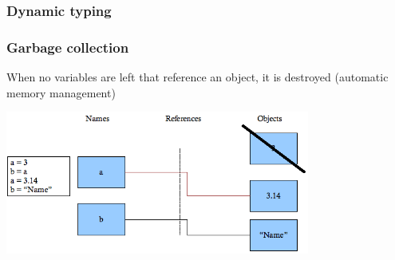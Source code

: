 \documentclass{beamer}
\begin{document}
\begin{frame}
\frametitle{Dynamic typing}
\begin{center}
\end{center}
\end{frame}

\begin{frame}
\frametitle{Garbage collection}
When no variables are left that reference an object, it is destroyed (automatic memory management)
\begin{center}
\includegraphics[width=10cm]{dynamic_typing_3}
\end{center}
\end{frame}
\end{document}
